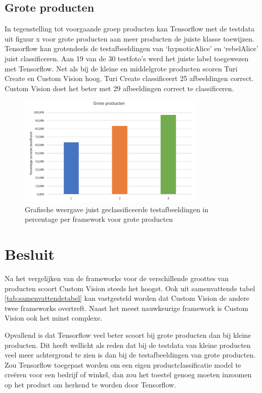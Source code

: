 \subsection{Grote producten}
\label{ssec:Grote producten}

In tegenstelling tot voorgaande groep producten kan Tensorflow met de testdata uit figuur x voor grote producten aan meer producten de juiste klasse toewijzen. Tensorflow kan grotendeels de testafbeeldingen van ‘hypnoticAlice’ en ‘rebelAlice’ juist classificeren. Aan 19 van de 30 testfoto’s werd het juiste label toegewezen met Tensorflow. Net als bij de kleine en middelgrote producten scoren Turi Create en Custom Vision hoog. Turi Create classificeert 25 afbeeldingen correct. Custom Vision doet het beter met 29 afbeeldingen correct te classificeren.  

\begin{figure}[ht!]
  \centering
      \includegraphics[width=0.8\textwidth]{img/grafiekgroteproducten.png}
  \caption{Grafische weergave juist geclassificeerde testafbeeldingen in percentage per framework voor grote producten}
  \label{fig:grafiekgroteproducten}
\end{figure}

\section{Besluit}
\label{sec:Besluit}

Na het vergelijken van de frameworks voor de verschillende groottes van producten scoort Custom Vision steeds het hoogst. Ook uit samenvattende tabel \ref{tab:samenvattendetabel} kan vastgesteld worden dat Custom Vision de andere twee frameworks overtreft. Naast het meest nauwkeurige framework is Custom Vision ook het minst complexe.

Opvallend is dat Tensorflow veel beter scoort bij grote producten dan bij kleine producten. Dit heeft wellicht als reden dat bij de testdata van kleine producten veel meer achtergrond te zien is dan bij de testafbeeldingen van grote producten.  Zou Tensorflow toegepast worden om een eigen productclassificatie model te creëren voor een bedrijf of winkel, dan zou het toestel genoeg moeten inzoomen op het product om herkend te worden door Tensorflow.

